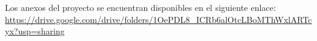 
Los anexos del proyecto se encuentran disponibles en el siguiente enlace: \url{https://drive.google.com/drive/folders/1OePDL8_ICRb6alOtcLBoMThWxlARTcyx?usp=sharing}